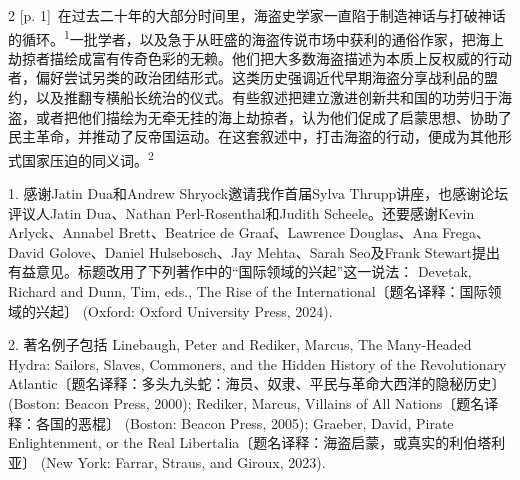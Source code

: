 \documentclass[10pt,a4paper]{article}
\begin{document}
\begin{paracol}{2}
{\scriptsize\color{gray} [p. 1]}\ 在过去二十年的大部分时间里，海盗史学家一直陷于制造神话与打破神话的循\mbox{环。\textsuperscript{1}}一批学者，以及急于从旺盛的海盗传说市场中获利的通俗作家，把海上劫掠者描绘成富有传奇色彩的无赖。他们把大多数海盗描述为本质上反权威的行动者，偏好尝试另类的政治团结形式。这类历史强调近代早期海盗分享战利品的盟约，以及推翻专横船长统治的仪式。有些叙述把建立激进创新共和国的功劳归于海盗，或者把他们描绘为无牵无挂的海上劫掠者，认为他们促成了启蒙思想、协助了民主革命，并推动了反帝国运动。在这套叙述中，打击海盗的行动，便成为其他形式国家压迫的同义\mbox{词。\textsuperscript{2}}\par{\small 1. 感谢Jatin Dua和Andrew Shryock邀请我作首届Sylva Thrupp讲座，也感谢论坛评议人Jatin Dua、Nathan Perl-Rosenthal和Judith Scheele。还要感谢Kevin Arlyck、Annabel Brett、Beatrice de Graaf、Lawrence Douglas、Ana Frega、David Golove、Daniel Hulsebosch、Jay Mehta、Sarah Seo及Frank Stewart提出有益意见。标题改用了下列著作中的“国际领域的兴起”这一说法： Devetak, Richard and Dunn, Tim, eds., The Rise of the International〔题名译释：国际领域的兴起〕 (Oxford: Oxford University Press, 2024).\par}{\small 2. 著名例子包括 Linebaugh, Peter and Rediker, Marcus, The Many-Headed Hydra: Sailors, Slaves, Commoners, and the Hidden History of the Revolutionary Atlantic〔题名译释：多头九头蛇：海员、奴隶、平民与革命大西洋的隐秘历史〕 (Boston: Beacon Press, 2000); Rediker, Marcus, Villains of All Nations〔题名译释：各国的恶棍〕 (Boston: Beacon Press, 2005); Graeber, David, Pirate Enlightenment, or the Real Libertalia〔题名译释：海盗启蒙，或真实的利伯塔利亚〕 (New York: Farrar, Straus, and Giroux, 2023).\par}
\switchcolumn

\end{paracol}
\end{document}
